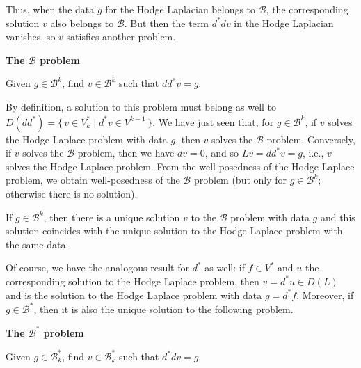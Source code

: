 {Thus, when the data $g$ for the Hodge Laplacian belongs to $\mathcal B$, the corresponding solution $v$ also belongs to $\mathcal B$. But then the term $d^*dv$ in the Hodge Laplacian vanishes, so $v$ satisfies another problem.}

\medskip\noindent\textbf{{The $\mathcal B$ problem}}\par
{Given $g\in\mathcal B^k$, find $v\in\mathcal B^k$ such that $dd^*v=g$.}

{By definition, a solution to this problem must belong as well to $D(dd^*)=\{\,v\in V_k^*\mid d^*v\in V^{k-1}\,\}$. We have just seen that, for $g\in\mathcal B^k$, if $v$ solves the Hodge Laplace problem with data $g$, then $v$ solves the $\mathcal B$ problem. Conversely, if $v$ solves the $\mathcal B$ problem, then we have $dv=0$, and so $Lv=dd^*v=g$, i.e., $v$ solves the Hodge Laplace problem. From the well-posedness of the Hodge Laplace problem, we obtain well-posedness of the $\mathcal B$ problem (but only for $g\in\mathcal B^k$; otherwise there is no solution).}

\begin{Theorem}\label{thm:hodge-boundary-problem}
{If $g\in\mathcal B^k$, then there is a unique solution $v$ to the $\mathcal B$ problem with data $g$ and this solution coincides with the unique solution to the Hodge Laplace problem with the same data.}
\end{Theorem}

{Of course, we have the analogous result for $d^*$ as well: if $f\in V^*$ and $u$ the corresponding solution to the Hodge Laplace problem, then $v=d^*u\in D(L)$ and is the solution to the Hodge Laplace problem with data $g=d^*f$. Moreover, if $g\in\mathcal B^*$, then it is also the unique solution to the following problem.}

\medskip\noindent\textbf{{The $\mathcal B^*$ problem}}\par
{Given $g\in\mathcal B_k^*$, find $v\in\mathcal B_k^*$ such that $d^*dv=g$.}
